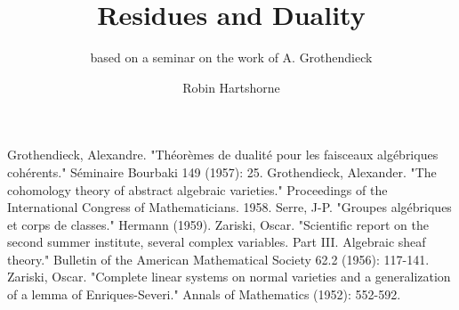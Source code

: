 \documentclass[graybox,envcountchap,sectrefs]{svmono}
\begin{document}
\author{Robin Hartshorne}
\title{Residues and Duality}
\subtitle{based on a seminar on the work of A. Grothendieck}
\maketitle

\frontmatter%

% 
% 

% 


\tableofcontents

% 


\mainmatter%
% 


% 
% 

\backmatter%

% 

\biblstarthook{}

\begin{thebibliography}{99.}%
%
%

 Grothendieck, Alexandre. "Théorèmes de dualité pour les faisceaux algébriques cohérents." Séminaire Bourbaki 149 (1957): 25.
 Grothendieck, Alexander. "The cohomology theory of abstract algebraic varieties." Proceedings of the International Congress of Mathematicians. 1958.
 Serre, J-P. "Groupes algébriques et corps de classes." Hermann (1959).
 Zariski, Oscar. "Scientific report on the second summer institute, several complex variables. Part III. Algebraic sheaf theory." Bulletin of the American Mathematical Society 62.2 (1956): 117-141.
 Zariski, Oscar. "Complete linear systems on normal varieties and a generalization of a lemma of Enriques-Severi." Annals of Mathematics (1952): 552-592.
\end{thebibliography}
\end{document}
